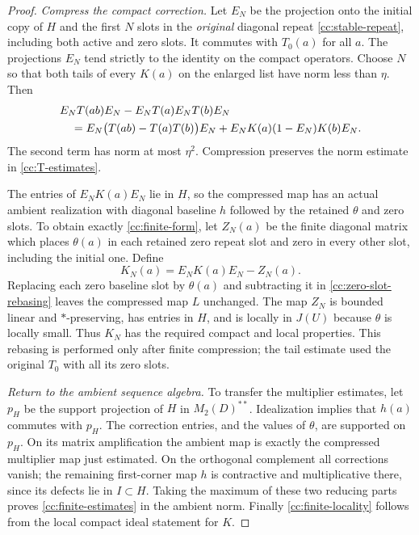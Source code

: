 \begin{proof}
\smallskip\noindent\emph{Compress the compact correction.} 
Let $E_N$ be the projection onto the initial copy of $H$ and the
first $N$ slots in the \emph{original} diagonal repeat
\eqref{cc:stable-repeat}, including both active and zero slots.  It
commutes with $T_0(a)$ for all $a$.  The projections $E_N$ tend
strictly to the identity on the compact operators.  Choose $N$
so that both tails of every $K(a)$ on the enlarged list have
norm less than $\eta$.  Then
\begin{align}
 &E_NT(ab)E_N-E_NT(a)E_NT(b)E_N\notag\\
 &\quad=E_N\bigl(T(ab)-T(a)T(b)\bigr)E_N
       +E_NK(a)(1-E_N)K(b)E_N.
 \label{cc:compression-defect}
\end{align}
The second term has norm at most $\eta^2$.  Compression preserves
the norm estimate in \eqref{cc:T-estimates}.

The entries of $E_NK(a)E_N$ lie in $H$, so the compressed map
has an actual ambient realization with diagonal baseline $h$
followed by the retained $\theta$ and zero slots.  To obtain
exactly \eqref{cc:finite-form}, let $Z_N(a)$ be the finite diagonal
matrix which places $\theta(a)$ in each retained zero repeat slot
and zero in every other slot, including the initial one.  Define
\begin{equation}\label{cc:zero-slot-rebasing}
 K_N(a)=E_NK(a)E_N-Z_N(a).
\end{equation}
Replacing each zero baseline slot by $\theta(a)$ and subtracting
it in \eqref{cc:zero-slot-rebasing} leaves the compressed map $L$
unchanged.  The map $Z_N$ is bounded linear and $*$-preserving,
has entries in $H$, and is locally in $J(U)$ because $\theta$ is
locally small.  Thus $K_N$ has the required compact and local
properties.  This rebasing is performed only after finite
compression; the tail estimate used the original $T_0$ with
all its zero slots.

\smallskip\noindent\emph{Return to the ambient sequence algebra.} 
To transfer the multiplier estimates, let $p_H$ be the support
projection of $H$ in $M_2(D)^{**}$.  Idealization implies that
$h(a)$ commutes with $p_H$.  The correction entries, and the
values of $\theta$, are supported on $p_H$.  On its matrix
amplification the ambient map is exactly the compressed
multiplier map just estimated.  On the orthogonal complement
all corrections vanish; the remaining first-corner map $h$
is contractive and multiplicative there, since its defects lie
in $I\subset H$.  Taking the maximum of these two reducing
parts proves \eqref{cc:finite-estimates} in the ambient norm.
Finally \eqref{cc:finite-locality} follows from the local
compact ideal statement for $K$.
\end{proof}

